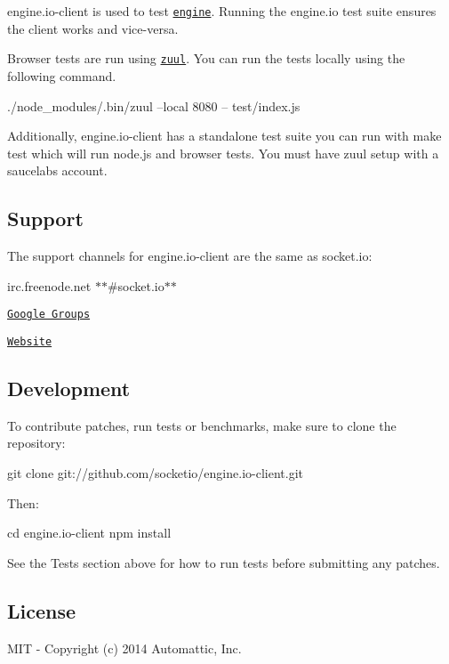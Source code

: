 {\ttfamily engine.\+io-\/client} is used to test \href{http://github.com/socketio/engine.io}{\tt engine}. Running the {\ttfamily engine.\+io} test suite ensures the client works and vice-\/versa.

Browser tests are run using \href{https://github.com/defunctzombie/zuul}{\tt zuul}. You can run the tests locally using the following command.


\begin{DoxyCode}
./node\_modules/.bin/zuul --local 8080 -- test/index.js
\end{DoxyCode}


Additionally, {\ttfamily engine.\+io-\/client} has a standalone test suite you can run with {\ttfamily make test} which will run node.\+js and browser tests. You must have zuul setup with a saucelabs account.

\subsection*{Support}

The support channels for {\ttfamily engine.\+io-\/client} are the same as {\ttfamily socket.\+io}\+:
\begin{DoxyItemize}
\item irc.\+freenode.\+net $\ast$$\ast$\#socket.\+io$\ast$$\ast$
\item \href{http://groups.google.com/group/socket_io}{\tt Google Groups}
\item \href{http://socket.io}{\tt Website}
\end{DoxyItemize}

\subsection*{Development}

To contribute patches, run tests or benchmarks, make sure to clone the repository\+:


\begin{DoxyCode}
git clone git://github.com/socketio/engine.io-client.git
\end{DoxyCode}


Then\+:


\begin{DoxyCode}
cd engine.io-client
npm install
\end{DoxyCode}


See the {\ttfamily Tests} section above for how to run tests before submitting any patches.

\subsection*{License}

M\+IT -\/ Copyright (c) 2014 Automattic, Inc. 
